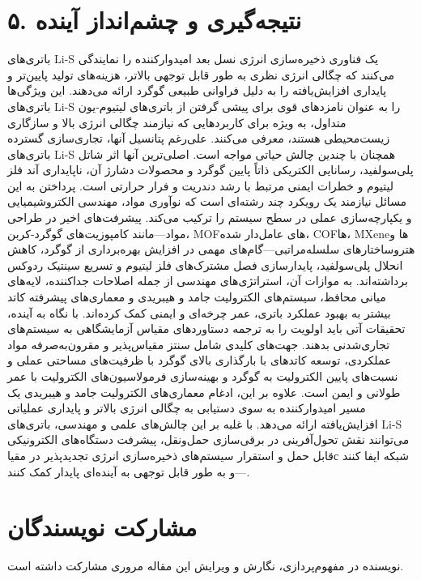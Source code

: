 \documentclass[12pt,a4paper,twocolumn]{article} %
\newcommand{\persian}[1]{\textfarsi{#1}}
\newcommand{\english}[1]{\textenglish{#1}}
\begin{document}
\section*{\persian{۵. نتیجه‌گیری و چشم‌انداز آینده}}
\persian{
باتری‌های \english{Li-S} یک فناوری ذخیره‌سازی انرژی نسل بعد امیدوارکننده را نمایندگی می‌کنند که چگالی انرژی نظری به طور قابل توجهی بالاتر، هزینه‌های تولید پایین‌تر و پایداری افزایش‌یافته را به دلیل فراوانی طبیعی گوگرد ارائه می‌دهند. این ویژگی‌ها باتری‌های \english{Li-S} را به عنوان نامزدهای قوی برای پیشی گرفتن از باتری‌های لیتیوم-یون متداول، به ویژه برای کاربردهایی که نیازمند چگالی انرژی بالا و سازگاری زیست‌محیطی هستند، معرفی می‌کنند. علی‌رغم پتانسیل آنها، تجاری‌سازی گسترده باتری‌های \english{Li-S} همچنان با چندین چالش حیاتی مواجه است. اصلی‌ترین آنها اثر شاتل پلی‌سولفید، رسانایی الکتریکی ذاتاً پایین گوگرد و محصولات دشارژ آن، ناپایداری آند فلز لیتیوم و خطرات ایمنی مرتبط با رشد دندریت و فرار حرارتی است. پرداختن به این مسائل نیازمند یک رویکرد چند رشته‌ای است که نوآوری مواد، مهندسی الکتروشیمیایی و یکپارچه‌سازی عملی در سطح سیستم را ترکیب می‌کند. پیشرفت‌های اخیر در طراحی مواد—مانند کامپوزیت‌های گوگرد-کربن، \english{MOF}های عامل‌دار شده، \english{COF}ها، \english{MXene}ها و هتروساختارهای سلسله‌مراتبی—گام‌های مهمی در افزایش بهره‌برداری از گوگرد، کاهش انحلال پلی‌سولفید، پایدارسازی فصل مشترک‌های فلز لیتیوم و تسریع سینتیک ردوکس برداشته‌اند. به موازات آن، استراتژی‌های مهندسی از جمله اصلاحات جداکننده، لایه‌های میانی محافظ، سیستم‌های الکترولیت جامد و هیبریدی و معماری‌های پیشرفته کاتد بیشتر به بهبود عملکرد باتری، عمر چرخه‌ای و ایمنی کمک کرده‌اند. با نگاه به آینده، تحقیقات آتی باید اولویت را به ترجمه دستاوردهای مقیاس آزمایشگاهی به سیستم‌های تجاری‌شدنی بدهند. جهت‌های کلیدی شامل سنتز مقیاس‌پذیر و مقرون‌به‌صرفه مواد عملکردی، توسعه کاتدهای با بارگذاری بالای گوگرد با ظرفیت‌های مساحتی عملی و نسبت‌های پایین الکترولیت به گوگرد و بهینه‌سازی فرمولاسیون‌های الکترولیت با عمر طولانی و ایمن است. علاوه بر این، ادغام معماری‌های الکترولیت جامد و هیبریدی یک مسیر امیدوارکننده به سوی دستیابی به چگالی انرژی بالاتر و پایداری عملیاتی افزایش‌یافته ارائه می‌دهد. با غلبه بر این چالش‌های علمی و مهندسی، باتری‌های \english{Li-S} می‌توانند نقش تحول‌آفرینی در برقی‌سازی حمل‌ونقل، پیشرفت دستگاه‌های الکترونیکی قابل حمل و استقرار سیستم‌های ذخیره‌سازی انرژی تجدیدپذیر در مقیاс شبکه ایفا کنند—و به طور قابل توجهی به آینده‌ای پایدار کمک کنند.
}

\section*{\persian{مشارکت نویسندگان}}
\persian{
نویسنده در مفهوم‌پردازی، نگارش و ویرایش این مقاله مروری مشارکت داشته است.
}
\end{document}
